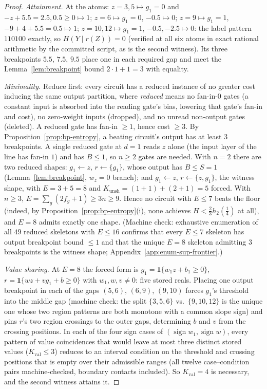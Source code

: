 \documentclass[twocolumn,10pt]{article}
\theoremstyle{definition}
\theoremstyle{remark}
\newcommand{\hb}{h_2}
\newcommand{\Kunsh}{K_{\mathrm{unsh}}}
\newcommand{\Kval}{K_{\mathrm{val}}}
\begin{document}
\begin{proof}
\emph{Attainment.} At the atoms: $z = 3, 5 \mapsto g_1 = 0$ and
$-z + 5.5 = 2.5, 0.5 \ge 0 \mapsto 1$; $z = 6 \mapsto g_1 = 0$,
$-0.5 \mapsto 0$; $z = 9 \mapsto g_1 = 1$,
$-9 + 4 + 5.5 = 0.5 \mapsto 1$; $z = 10, 12 \mapsto g_1 = 1$,
$-0.5, -2.5 \mapsto 0$: the label pattern $110100$ exactly, so
$H(Y \mid r(Z)) = 0$ (verified at all six atoms in exact rational
arithmetic by the committed script, as is the second witness). Its
three breakpoints $5.5$, $7.5$, $9.5$ place one in each required gap
and meet the Lemma~\ref{lem:breakpoint} bound $2 \cdot 1 + 1 = 3$ with
equality.

\sloppy
\emph{Minimality.} Reduce first: every circuit has a reduced instance
of no greater cost inducing the same output partition, where
\emph{reduced} means no fan-in-0 gates (a constant input is absorbed
into the reading gate's bias, lowering that gate's fan-in and cost), no
zero-weight inputs (dropped), and no unread non-output gates (deleted).
A reduced gate has fan-in $\ge 1$, hence cost $\ge 3$. By
Proposition~\ref{prop:bp-entropy}, a beating circuit's output has at
least $3$ breakpoints. A single reduced gate at $d = 1$ reads $z$ alone
(the input layer of the line has fan-in $1$) and has $B \le 1$, so
$n \ge 2$ gates are needed. With $n = 2$ there are two reduced shapes:
$g_1 \!\leftarrow\! z$, $r \!\leftarrow\! \{g_1\}$, whose output has
$B \le S = 1$ (Lemma~\ref{lem:breakpoint}, $w_z = 0$ branch); and
$g_1 \!\leftarrow\! z$, $r \!\leftarrow\! \{z, g_1\}$, the witness
shape, with $E = 3 + 5 = 8$ and $\Kunsh = (1{+}1) + (2{+}1) = 5$
forced. With $n \ge 3$, $E = \sum_g (2 f_g + 1) \ge 3n \ge 9$. Hence no
circuit with $E \le 7$ beats the floor (indeed, by
Proposition~\ref{prop:bp-entropy}(i), none achieves
$H < \tfrac23 \hb(\tfrac14)$ at all), and $E = 8$ admits exactly one
shape. (Machine check: exhaustive enumeration of all $49$ reduced
skeletons with $E \le 16$ confirms that every $E \le 7$ skeleton has
output breakpoint bound $\le 1$ and that the unique $E = 8$ skeleton
admitting $3$ breakpoints is the witness shape;
Appendix~\ref{app:enum-sup-frontier}.)

\emph{Value sharing.} At $E = 8$ the forced form is
$g_1 = \mathbf 1\{w_1 z + b_1 \ge 0\}$,
$r = \mathbf 1\{w z + v g_1 + b \ge 0\}$ with $w_1, w, v \neq 0$:
five stored reals. Placing one output breakpoint in each of the gaps
$(5,6)$, $(6,9)$, $(9,10)$ forces $g_1$'s threshold into the middle gap
(machine check: the split $\{3,5,6\}$ vs.\ $\{9,10,12\}$ is the unique
one whose two region patterns are both monotone with a common slope
sign) and pins $r$'s two region crossings to the outer gaps,
determining $b$ and $v$ from the crossing positions. In each of the
four sign cases of $(\operatorname{sign} w_1, \operatorname{sign} w)$,
every pattern of value coincidences that would leave at most three
distinct stored values ($\Kval \le 3$) reduces to an interval
condition on the
threshold and crossing positions that is empty over their admissible
ranges (all twelve case--condition pairs machine-checked, boundary
contacts included). So $\Kval = 4$ is necessary, and the
second witness attains it.
\end{proof}
\end{document}
